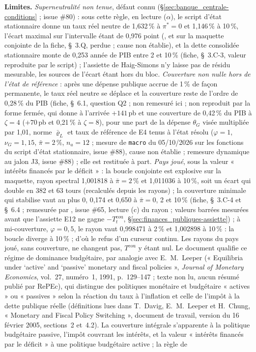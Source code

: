 \documentclass[11pt,a4paper]{article}
\newcommand{\limites}{\par\noindent\textbf{Limites.} }
\newcommand{\code}[1]{\texttt{\detokenize{#1}}}
\newcommand{\barre}[1]{\leavevmode\sbox{\boitebarre}{#1}\rlap{\rule[0.6ex]{\wd\boitebarre}{0.4pt}}\usebox{\boitebarre}}
\begin{document}
\begin{proposee}
\limites \emph{Superneutralité non tenue}, défaut connu (\S\ref{sec:banque_centrale-conditions} ; issue \#80) : sous cette règle, en lecture ($\alpha$), le script d'état stationnaire donne un taux réel neutre de 1,632\,\% à $\pi^\ast = 0$ et 1,146\,\% à 10\,\%, l'écart maximal sur l'intervalle étant de 0,976 point (\barre{1,536}, \barre{1,075\,\%} et \barre{0,74 point} sur la maquette conjointe de la fiche, \S~3.Q, perdue ; cause non établie), et la dette consolidée stationnaire monte de 0,253 année de PIB entre 2 et 10\,\% (fiche, \S~3.C-3, valeur reproduite par le script) ; l'assiette de Haig-Simons n'y laisse pas de résidu mesurable, les sources de l'écart étant hors du bloc. \emph{Couverture non nulle hors de l'état de référence} : après une dépense publique accrue de 1\,\% de façon permanente, le taux réel neutre se déplace et la couverture reste de l'ordre de 0,28\,\% du PIB (fiche, \S~6.1, question Q2 ; non remesuré ici ; non reproduit par la forme fermée, qui donne à l'arrivée $+141$\,pb et une couverture de 0,42\,\% du PIB à $\zeta = 4$ ($+70$\,pb et 0,21\,\% à $\zeta = 8$), pour une part de la dépense $\theta_G$ visée multipliée par 1,01, norme $\bar\varrho_L$ et taux de référence de E4 tenus à l'état résolu ($\varphi = 1$, $\nu_G = 1{,}15$, $\bar\pi = 2\,\%$, $n_a = 12$ ; mesure de \texttt{macro} du 05/10/2026 sur les fonctions du script d'état stationnaire, issue \#88), cause non établie ; remesure dynamique au jalon J3, issue \#88) ; elle est restituée à part. \emph{Pays joué}, sous la valeur « intérêts financés par le déficit » : la boucle conjointe est explosive sur la maquette, rayon spectral 1,001818 à $\bar\pi = 2\,\%$ et 1,011036 à 10\,\%, soit un écart qui double en 382 et 63 tours (recalculés depuis les rayons) ; la couverture minimale qui stabilise vaut au plus 0, \barre{0,131} 0,174 et \barre{0,487} 0,650 à $\bar\pi = 0$, 2 et 10\,\% (fiche, \S~3.C-4 et \S~6.4 ; remesurée par \code{outils/maquette_conjointe.py}, issue \#65, lecture (c) du rayon ; valeurs barrées mesurées avant que l'assiette E12 ne gagne $-T^{\mathrm{cou}}_t$, \S\ref{sec:finances_publiques-assiette}) ; à mi-couverture, $\varphi = 0{,}5$, le rayon vaut 0,998471 à 2\,\% et 1,002898 à 10\,\% : la boucle diverge à 10\,\% ; d'où le refus d'un curseur continu. Les rayons du pays joué, sans couverture, ne changent pas, $T^{\mathrm{cou}}$ y étant nul. Le document qualifie ce régime de dominance budgétaire, par analogie avec E.~M.~Leeper (« Equilibria under `active' and `passive' monetary and fiscal policies », \emph{Journal of Monetary Economics}, vol.~27, numéro~1, 1991, p.~129--147 ; texte non lu, aucun résumé publié par RePEc), qui distingue des politiques monétaire et budgétaire « actives » ou « passives » selon la réaction du taux à l'inflation et celle de l'impôt à la dette publique réelle (définitions lues dans T.~Davig, E.~M.~Leeper et H.~Chung, « Monetary and Fiscal Policy Switching », document de travail, version du 16 février 2005, sections~2 et~4.2). La couverture intégrale s'apparente à la politique budgétaire passive, l'impôt couvrant les intérêts, et la valeur « intérêts financés par le déficit » à une politique budgétaire active ; la règle de 
\end{proposee}
\end{document}

